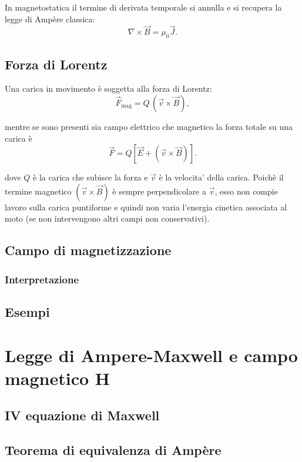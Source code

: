 \documentclass{book}
\begin{document}
In magnetostatica il termine di derivata temporale si annulla e si recupera la legge di Amp\`ere classica:
\begin{equation}
\nabla\times\vec B = \mu_0\vec J.
\end{equation}

\section{Forza di Lorentz}

Una carica in movimento \`e soggetta alla forza di Lorentz:
\begin{equation}
\vec{F}_{\mathrm{mag}} = Q\,\left(\vec v\times\vec B\right),
\end{equation}

mentre se sono presenti sia campo elettrico che magnetico la forza totale su una carica \`e
\begin{equation}
\vec{F} = Q\left[\vec E + \left(\vec v\times\vec B\right)\right].
\end{equation}

dove \(Q\) \`e la carica che subisce la forza e \(\vec{v}\) \`e la velocita' della carica.
Poich\`e il termine magnetico \((\vec v\times\vec B)\) \`e sempre perpendicolare a $\vec v$, esso non compie lavoro sulla carica puntiforme e quindi non varia l'energia cinetica associata al moto (se non intervengono altri campi non conservativi).

\section{Campo di magnetizzazione}
\subsection{Interpretazione}
\section{Esempi}

\chapter{Legge di Ampere-Maxwell e campo magnetico H}
\section{IV equazione di Maxwell}
\section{Teorema di equivalenza di Amp\`ere}
\end{document}
